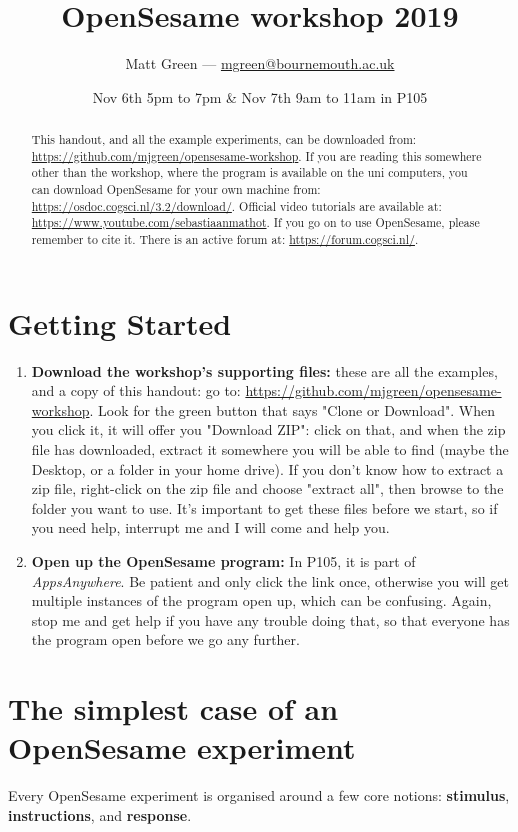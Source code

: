 \documentclass[a4paper]{tufte-handout}
\title{OpenSesame workshop 2019}%
\date{Nov 6th 5pm to 7pm \& Nov 7th 9am to 11am in P105}
\author{Matt Green --- \href{mailto:mgreen@bournemouth.ac.uk}{mgreen@bournemouth.ac.uk} }
\begin{document}


\pagestyle{fancy}
\maketitle
\begin{abstract}
This handout, and all the example experiments, can be downloaded from:  \url{https://github.com/mjgreen/opensesame-workshop}. If you are reading this somewhere other than the workshop, where the program is available on the uni computers, you can download OpenSesame for your own machine from: \url{https://osdoc.cogsci.nl/3.2/download/}. Official video tutorials are available at: \url{https://www.youtube.com/sebastiaanmathot}. If you go on to use OpenSesame, please remember to cite it\cite{Mathot2012}. There is an active forum at: \url{https://forum.cogsci.nl/}.
\end{abstract}
\tableofcontents

\section{Getting Started}
\begin{enumerate}
\item \textbf{Download the workshop's supporting files:} these are  all the examples, and a copy of this handout: go to: \url{https://github.com/mjgreen/opensesame-workshop}. Look for the green button that says "Clone or Download". When you click it, it will offer you "Download ZIP": click on that, and when the zip file has downloaded, extract it somewhere you will be able to find (maybe the Desktop, or a folder in your home drive). If you don't know how to extract a zip file, right-click on the zip file and choose "extract all", then browse to the folder you want to use. It's important to get these files before we start, so if you need help, interrupt me and I will come and help you.
\item \textbf{Open up the OpenSesame program:} In P105, it is part of \emph{AppsAnywhere}. Be patient and only click the link once, otherwise you will get multiple instances of the program open up, which can be confusing. Again, stop me and get help if you have any trouble doing that, so that everyone has the program open before we go any further.
\end{enumerate}

\section{The simplest case of an OpenSesame experiment}
Every OpenSesame experiment is organised around a few core notions: \textbf{stimulus}, \textbf{instructions}, and \textbf{response}.
\end{document}

